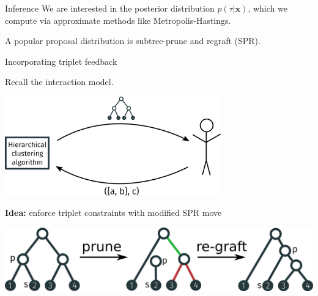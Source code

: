 \documentclass[10pt, compress]{beamer}
\begin{document}
\begin{frame}{Inference}
  We are interested in the posterior distribution
  $p(\tau | \bm{x})$, which we compute
  via approximate methods like Metropolis-Hastings.
  
  \pause

  A popular proposal distribution is \alert{subtree-prune
  and regraft} (SPR).

  \begin{center}
  \end{center}

\end{frame}

\begin{frame}{Incorporating triplet feedback}

  Recall the interaction model.

  \begin{center}
    \includegraphics[width=0.7\textwidth]{img/interaction-3}
  \end{center}
  \pause

  \textbf{Idea:}  enforce triplet constraints with
  modified SPR move

  \pause

  \begin{center}
    \includegraphics[width=\textwidth]{img/cspr-animation}
  \end{center}
\end{frame}
\end{document}
